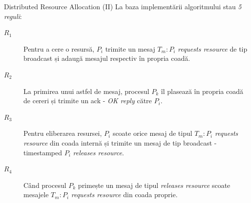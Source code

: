 \documentclass[9pt]{beamer}
\begin{document}
\begin{frame}{Distributed Resource Allocation (II)}
\Large{La baza implementării algoritmului stau \textit{5 reguli}:}
    \begin{description}
        \item[$R_1$] Pentru a cere o resursă, $P_i$ trimite un mesaj $T_m:P_i$ \textit{requests resource} de tip broadcast și adaugă mesajul respectiv în propria coadă.
        \vskip5pt
        \item[$R_2$] La primirea unui astfel de mesaj, procesul $P_k$ îl plasează în propria coadă de cereri și trimite un ack - \textit{OK reply} către $P_i$.
        \vskip5pt
        \item[$R_3$] Pentru eliberarea resursei, $P_i$ scoate orice mesaj de tipul $T_m:P_i$ \textit{requests resource} din coada internă și trimite un mesaj de tip broadcast - timestamped $P_i$ \textit{releases resource}.
        \item[$R_4$] Când procesul $P_k$ primește un mesaj de tipul \textit{releases resource} scoate mesajele $T_m:P_i$ \textit{requests resource} din coada proprie.
    \end{description}
\end{frame}
\end{document}
